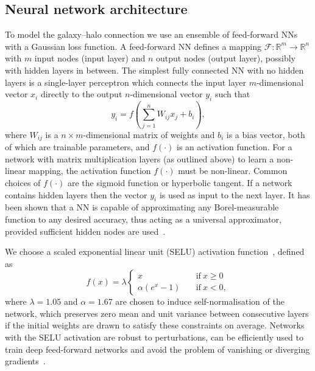 \documentclass[usenatbib,useAMS]{mnras}
\begin{document}
\subsection{Neural network architecture}\label{sec:NNarchitecture}

To model the galaxy--halo connection we use an ensemble of feed-forward \acp{NN} with a Gaussian loss function. A feed-forward NN defines a mapping $\mathcal{F}: \mathbb{R}^m \rightarrow \mathbb{R}^n$ with $m$ input nodes (input layer) and $n$ output nodes (output layer), possibly with hidden layers in between. The simplest fully connected NN with no hidden layers is a single-layer perceptron which connects the input layer $m$-dimensional vector $x_i$ directly to the output $n$-dimensional vector $y_i$ such that
\begin{equation}
	y_i = f\left(\sum_{j=1}^{n} W_{ij} x_j + b_i\right),
\end{equation}
where $W_{ij}$ is a $n\times m$-dimensional matrix of weights and $b_i$ is a bias vector, both of which are trainable parameters, and $f(\cdot)$ is an activation function. For a network with matrix multiplication layers (as outlined above) to learn a non-linear mapping, the activation function $f(\cdot)$ must be non-linear. Common choices of $f(\cdot)$ are the sigmoid function or hyperbolic tangent. If a network contains hidden layers then the vector $y_i$ is  used as input to the next layer. It has been shown that a NN is capable of approximating any Borel-measurable function to any desired accuracy, thus acting as a universal approximator, provided sufficient hidden nodes are used~\citep{Hornik_universal_approximator}.

We choose a scaled exponential linear unit (SELU) activation function~\citep{Klambauer_SELU}, defined as
\begin{equation}
    f(x) = \lambda
    \begin{cases}
        x &\quad \mathrm{if}~ x \geq 0\\
        \alpha \left(e^x - 1\right) &\quad \mathrm{if}~ x < 0,
    \end{cases}
\end{equation}
where $\lambda = 1.05$ and $\alpha = 1.67$ are chosen to induce self-normalisation of the network, which preserves zero mean and unit variance between consecutive layers if the initial weights are drawn to satisfy these constraints on average. Networks with the SELU activation are robust to perturbations, can be efficiently used to train deep feed-forward networks and avoid the problem of vanishing or diverging gradients~\citep{Klambauer_SELU}.
\end{document}
